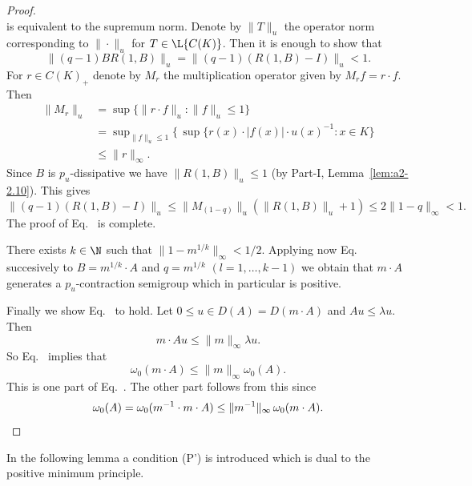 \begin{proof}
\[\]
is equivalent to the supremum norm.
Denote by $\|T\|_{u}$ the operator norm corresponding to $\|\cdot\|_{u}$ for $T \in \L{C(K)}$.
Then it is enough to show that 
%
\[
	 \|(q-1)BR(1,B)\|_{u} = \|(q-1)(R(1,B) - I)\|_{u} < 1 .
\]
%
For $r \in C(K)_{+}$ denote by $M_{r}$ the multiplication operator given by $M_{r}f = r \cdot f$.
Then 
\begin{align*}
	    \|M_{r}\|_{u} &= \sup\{\|r \cdot f\|_{u} \colon \|f\|_{u} \leq 1\} \\
	              &= \sup\nolimits_{\|f\|_{u} \leq 1}\{ \, 
	              \sup \{ r(x) \cdot |f(x)| \cdot u(x)^{-1}  \colon {x \in K} \}  \\
	              &\leq \|r\|_{\infty}.
\end{align*}
Since $B$ is $p_{u}$-dissipative we have $\|R(1,B)\|_{u} \leq 1$ (by Part-I, Lemma~\ref{lem:a2-2.10}).
This gives 
%
\[
	\|(q-1)(R(1,B) - I)\|_{u} \leq \|M_{(1-q)}\|_{u}(\|R(1,B)\|_{u} + 1) \leq 2\|1 - q\|_{\infty} < 1 .
\]
%
The proof of Eq.~ is complete.

There exists $k \in \N$ such that $\|1 - m^{1/k}\|_{\infty} < 1/2$.
Applying now Eq.~ 
succesively to $B = m^{1/k} \cdot A$ and $q = m^{1/k}$ $(l = 1, \ldots, k-1)$ we obtain that $m \cdot A$ generates a $p_{u}$-contraction semigroup which in particular is positive.

Finally we show Eq.~ to hold.
Let $0 \leq  u \in D(A) = D(m \cdot A)$ and $Au \leq \lambda u$.
Then 
%
\[
	m \cdot Au \leq \|m\|_{\infty}\lambda u .
\]
%
So Eq.~ implies that
%
\[
	  \omega_{0}(m \cdot A) \leq \|m\|_{\infty}\omega_{0}(A) .
\]
%
This is one part of Eq.~. 
The other part follows from this since 
%
\begin{equation*}
	\omega_{0}(A) = \omega_{0}(m^{-1} \cdot m \cdot A) \leq \|m^{-1}\|_{\infty} \, \omega_{0}(m \cdot A).
	\qedhere
\end{equation*}
%
\end{proof}
In the following lemma a condition (P') is introduced which is dual to the positive minimum principle.

